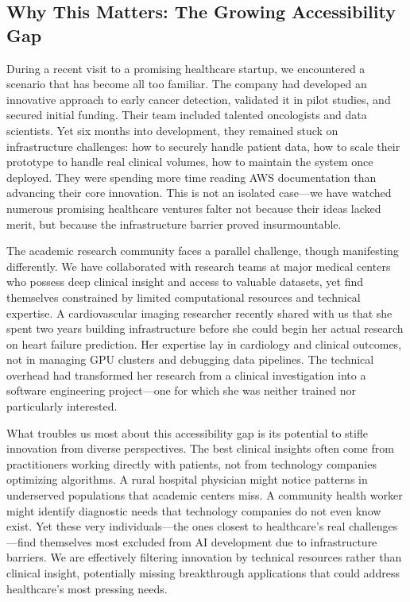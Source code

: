 \documentclass[12pt,a4paper]{article}
\begin{document}
\subsection{Why This Matters: The Growing Accessibility Gap}

During a recent visit to a promising healthcare startup, we encountered a scenario that has become all too familiar. The company had developed an innovative approach to early cancer detection, validated it in pilot studies, and secured initial funding. Their team included talented oncologists and data scientists. Yet six months into development, they remained stuck on infrastructure challenges: how to securely handle patient data, how to scale their prototype to handle real clinical volumes, how to maintain the system once deployed. They were spending more time reading AWS documentation than advancing their core innovation. This is not an isolated case—we have watched numerous promising healthcare ventures falter not because their ideas lacked merit, but because the infrastructure barrier proved insurmountable.

The academic research community faces a parallel challenge, though manifesting differently. We have collaborated with research teams at major medical centers who possess deep clinical insight and access to valuable datasets, yet find themselves constrained by limited computational resources and technical expertise. A cardiovascular imaging researcher recently shared with us that she spent two years building infrastructure before she could begin her actual research on heart failure prediction. Her expertise lay in cardiology and clinical outcomes, not in managing GPU clusters and debugging data pipelines. The technical overhead had transformed her research from a clinical investigation into a software engineering project—one for which she was neither trained nor particularly interested.

What troubles us most about this accessibility gap is its potential to stifle innovation from diverse perspectives. The best clinical insights often come from practitioners working directly with patients, not from technology companies optimizing algorithms. A rural hospital physician might notice patterns in underserved populations that academic centers miss. A community health worker might identify diagnostic needs that technology companies do not even know exist. Yet these very individuals—the ones closest to healthcare's real challenges—find themselves most excluded from AI development due to infrastructure barriers. We are effectively filtering innovation by technical resources rather than clinical insight, potentially missing breakthrough applications that could address healthcare's most pressing needs.
\end{document}
